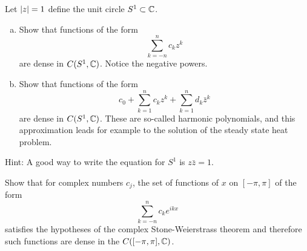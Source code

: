 \begin{exercise}
Let $\lvert {z} \rvert=1$ define the unit circle $S^1 \subset {\mathbb{C}}$.
\begin{enumerate}[a)]
\item
Show that functions of the form
\begin{equation*}
\sum_{k=-n}^n c_k z^k
\end{equation*}
are dense in $C(S^1,{\mathbb{C}})$.  Notice the negative powers.
\item 
Show that functions of the form
\begin{equation*}
c_0
+
\sum_{k=1}^n c_k z^k
+
\sum_{k=1}^n d_k \bar{z}^k
\end{equation*}
are dense in $C(S^1,{\mathbb{C}})$.  These are so-called harmonic polynomials,
and this approximation leads for example to the solution of the
steady state heat problem.
\end{enumerate}
Hint: A good way to write the equation for $S^1$ is $z \bar{z} = 1$.
\end{exercise}

\begin{exercise}
Show that for complex numbers $c_j$, the set of functions
of $x$ on $[-\pi,\pi]$
of the form
\begin{equation*}
\sum_{k=-n}^n c_k e^{ik x}
\end{equation*}
satisfies the hypotheses of the complex Stone-Weierstrass theorem
and therefore such functions are dense in the $C([-\pi,\pi],{\mathbb{C}})$.
\end{exercise}


